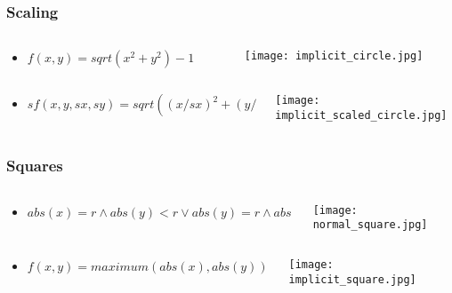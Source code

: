 \documentclass{beamer}
\begin{document}
\begin{frame}
\frametitle{Scaling}
\begin{columns}
  \begin{column}{0.5\textwidth}
    \begin{itemize}
    \item $f(x,y)=sqrt(x^2+y^2)-1$
    \end{itemize}
  \end{column}
  \begin{column}{0.5\textwidth}
    \texttt{[image: implicit\_circle.jpg]}
  \end{column}
\end{columns}
\begin{columns}
  \begin{column}{0.5\textwidth}
    \begin{itemize}
    \item $sf(x,y,sx,sy)=sqrt((x/sx)^2+(y/sy)^2)-1$
    \end{itemize}
  \end{column}
  \begin{column}{0.5\textwidth}
    \texttt{[image: implicit\_scaled\_circle.jpg]}
  \end{column}
\end{columns}
\end{frame}

\begin{frame}
\frametitle{Squares}
\begin{columns}
  \begin{column}{0.75\textwidth}
    \begin{itemize}
    \item $abs(x)=r \land abs(y)<r \lor abs(y)=r \land abs(x)<r$
    \end{itemize}
  \end{column}
  \begin{column}{0.25\textwidth}
    \texttt{[image: normal\_square.jpg]}
  \end{column}
\end{columns}
\begin{columns}
  \begin{column}{0.75\textwidth}
    \begin{itemize}
    \item $f(x,y)=maximum(abs(x),abs(y))-1$
    \end{itemize}
  \end{column}
  \begin{column}{0.25\textwidth}
    \texttt{[image: implicit\_square.jpg]}
  \end{column}
\end{columns}
\end{frame}
\end{document}
